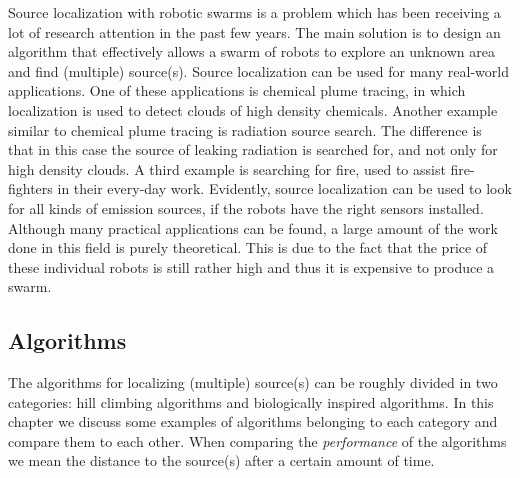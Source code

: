 
Source localization with robotic swarms is a problem which has been receiving a lot of research attention in the past few years. 
The main solution is to design an algorithm that effectively allows a swarm of robots to explore an unknown area and find (multiple) source(s).
Source localization can be used for many real-world applications.
One of these applications is chemical plume tracing, in which localization is used to detect clouds of high density chemicals. \cite{zarzhitsky2005distributed}
Another example similar to chemical plume tracing is radiation source search. \cite{bashyal2008human} 
The difference is that in this case the source of leaking radiation is searched for, and not only for high density clouds. 
A third example is searching for fire, used to assist fire-fighters in their every-day work. \cite{marjovi2009multi}
Evidently, source localization can be used to look for all kinds of emission sources, if the robots have the right sensors installed. \cite{cui2004swarm}
Although many practical applications can be found, a large amount of the work done in this field is purely theoretical.
This is due to the fact that the price of these individual robots is still rather high and thus it is expensive to produce a swarm.


\subsection{Algorithms}
The algorithms for localizing (multiple) source(s) can be roughly divided in two categories: hill climbing algorithms and biologically inspired algorithms.
In this chapter we discuss some examples of algorithms belonging to each category and compare them to each other.
When comparing the \emph{performance} of the algorithms we mean the distance to the source(s) after a certain amount of time. 

